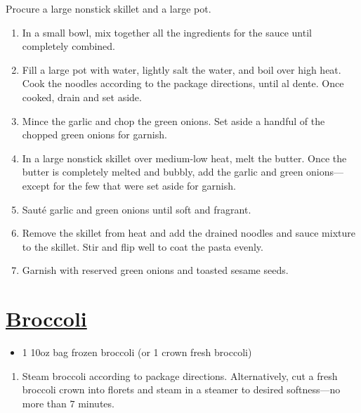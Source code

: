 \begin{minipage}{\textwidth}
\begin{vwcol}[widths={0.6,0.4}, rule=0pt]
\begin{minipage}{0.55\textwidth}
\instructions
Procure a large nonstick skillet and a large pot.
\begin{enumerate}
    \item In a small bowl, mix together all the ingredients for the sauce until completely combined.
    \item Fill a large pot with water, lightly salt the water, and boil over high heat. Cook the noodles according to the package directions, until al dente. Once cooked, drain and set aside.
    \item Mince the garlic and chop the green onions. Set aside a handful of the chopped green onions for garnish.
    \item In a large nonstick skillet over medium-low heat, melt the butter. Once the butter is completely melted and bubbly, add the garlic and green onions---except for the few that were set aside for garnish.
    \item Sauté garlic and green onions until soft and fragrant.
    \item Remove the skillet from heat and add the drained noodles and sauce mixture to the skillet. Stir and flip well to coat the pasta evenly.
    \item Garnish with reserved green onions and toasted sesame seeds.
\end{enumerate}
\end{minipage}

\newpage
\begin{minipage}{0.3\linewidth}
\section*{\underline{Broccoli}}
\ingredients
\vspace{-1em}
\begin{itemize}
    \item 1 10oz bag frozen broccoli (or 1 crown fresh broccoli)
\end{itemize}
\vspace{1em}

\instructions
\vspace{-1em}
\begin{enumerate}
    \item Steam broccoli according to package directions. Alternatively, cut a fresh broccoli crown into florets and steam in a steamer to desired softness---no more than $7$ minutes.
\end{enumerate}


\end{minipage}
\end{vwcol}
\end{minipage}
